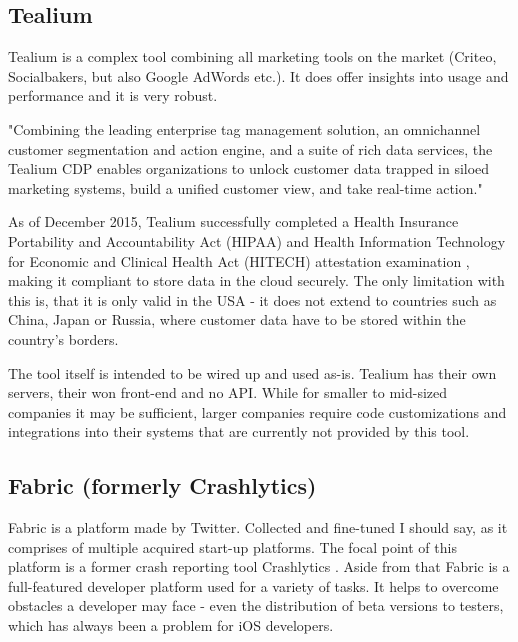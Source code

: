 \subsection{Tealium}

Tealium is a complex tool combining all marketing tools on the market (Criteo, Socialbakers, but also Google AdWords etc.). It does offer insights into usage and performance and it is very robust. 

\bigbreak

"Combining the leading enterprise tag management solution, an omnichannel customer segmentation and action engine, and a suite of rich data services, the Tealium CDP enables organizations to unlock customer data trapped in siloed marketing systems, build a unified customer view, and take real-time action." \cite{tealium}

\bigbreak

As of December 2015, Tealium successfully completed a Health Insurance Portability and Accountability Act (HIPAA) and Health Information Technology for Economic and Clinical Health Act (HITECH) attestation examination \cite{hipaa}, making it compliant to store data in the cloud securely. The only limitation with this is, that it is only valid in the USA - it does not extend to countries such as China, Japan or Russia, where customer data have to be stored within the country's borders.

The tool itself is intended to be wired up and used as-is. Tealium has their own servers, their won front-end and no API. While for smaller to mid-sized companies it may be sufficient, larger companies require code customizations and integrations into their systems that are currently not provided by this tool.

\subsection{Fabric (formerly Crashlytics)}

Fabric is a platform made by Twitter. Collected and fine-tuned I should say, as it comprises of multiple acquired start-up platforms. The focal point of this platform is a former crash reporting tool Crashlytics \cite{crashlytics}. Aside from that Fabric is a full-featured developer platform used for a variety of tasks. It helps to overcome obstacles a developer may face - even the distribution of beta versions to testers, which has always been a problem for iOS developers.

\bigbreak

